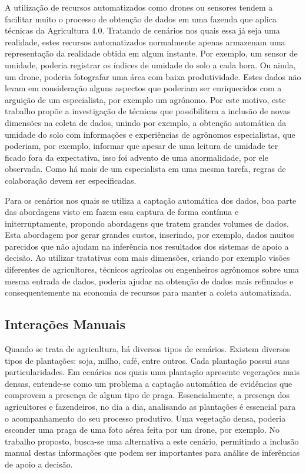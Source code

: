 A utilização de recursos automatizados como drones ou sensores tendem a facilitar muito o processo de obtenção de dados em uma fazenda que aplica técnicas da Agricultura 4.0. Tratando de cenários nos quais essa já seja uma realidade, estes recursos automatizados normalmente apenas armazenam uma representação da realidade obtida em algum instante. Por exemplo, um sensor de umidade, poderia registrar os índices de umidade do solo a cada hora. Ou ainda, um drone, poderia fotografar uma área com baixa produtividade. Estes dados não levam em consideração alguns aspectos que poderiam ser enriquecidos com a arguição de um especialista, por exemplo um agrônomo. Por este motivo, este trabalho propõe a investigação de técnicas que possibilitem a inclusão de novas dimensões na coleta de dados, unindo por exemplo, a obtenção automática da umidade do solo com informações e experiências de agrônomos especialistas, que poderiam, por exemplo, informar que apesar de uma leitura de umidade ter ficado fora da expectativa, isso foi advento de uma anormalidade, por ele observada. Como há mais de um especialista em uma mesma tarefa, regras de colaboração devem ser especificadas.

Para os cenários nos quais se utiliza a captação automática dos dados, boa parte das abordagens visto em \cite{Massruha:2017} fazem essa captura de forma contínua e initerruptamente, propondo abordagens que tratem grandes volumes de dados. Esta abordagem por gerar grandes custos, inserindo, por exemplo, dados muitos parecidos que não ajudam na inferência nos resultados dos sistemas de apoio a decisão. Ao utilizar tratativas com mais dimensões, criando por exemplo visões diferentes de agricultores, técnicos agrícolas ou engenheiros agrônomos sobre uma mesma entrada de dados, poderia ajudar na obtenção de dados mais refinados e consequentemente na economia de recursos para manter a coleta automatizada.

\subsection{Interações Manuais}
\label{subsec:interacoes_manuais}

Quando se trata de agricultura, há diversos tipos de cenários. Existem diversos tipos de plantações: soja, milho, café, entre outros. Cada plantação possui suas particularidades. Em cenários nos quais uma plantação apresente vegerações mais densas, entende-se como um problema a captação automática de evidências que comprovem a presença de algum tipo de praga. Essencialmente, a presença dos agricultores e fazendeiros, no dia a dia, analisando as plantações é essencial para o acompanhamento do seu processo produtivo. Uma vegetação densa, poderia esconder uma praga de uma foto aérea feita por um drone, por exemplo. No trabalho proposto, busca-se uma alternativa a este cenário, permitindo a inclusão manual destas informações que podem ser importantes para análise de inferências de apoio a decisão.

